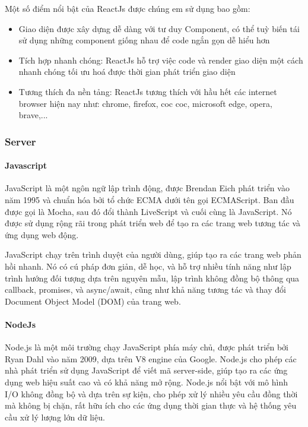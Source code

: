Một số điểm nổi bật của ReactJs được chúng em sử dụng bao gồm:


\begin{itemize}
  \item Giao diện được xây dựng dễ dàng với tư duy Component, có thể tuỳ biến tái sử dụng những component giống nhau để code ngắn gọn dễ hiểu hơn
  \item Tích hợp nhanh chóng: ReactJs hỗ trợ việc code và render giao diện một cách nhanh chóng tối ưu hoá được thời gian phát triển giao diện
  \item Tương thích đa nền tảng: ReactJs tương thích với hầu hết các internet browser hiện nay như: chrome, firefox, coc coc, microsoft edge, opera, brave,...
\end{itemize}

\subsubsection{Server}
\paragraph{Javascript}
\mbox{}

JavaScript là một ngôn ngữ lập trình động, được Brendan Eich phát triển vào năm 1995 và chuẩn hóa bởi tổ chức ECMA dưới tên gọi ECMAScript. Ban đầu được gọi là Mocha, sau đó đổi thành LiveScript và cuối cùng là JavaScript. Nó được sử dụng rộng rãi trong phát triển web để tạo ra các trang web tương tác và ứng dụng web động.

JavaScript chạy trên trình duyệt của người dùng, giúp tạo ra các trang web phản hồi nhanh. Nó có cú pháp đơn giản, dễ học, và hỗ trợ nhiều tính năng như lập trình hướng đối tượng dựa trên nguyên mẫu, lập trình không đồng bộ thông qua callback, promises, và async/await, cũng như khả năng tương tác và thay đổi Document Object Model (DOM) của trang web.


\paragraph{NodeJs}
\mbox{}
Node.js là một môi trường chạy JavaScript phía máy chủ, được phát triển bởi Ryan Dahl vào năm 2009, dựa trên V8 engine của Google. Node.js cho phép các nhà phát triển sử dụng JavaScript để viết mã server-side, giúp tạo ra các ứng dụng web hiệu suất cao và có khả năng mở rộng. Node.js nổi bật với mô hình I/O không đồng bộ và dựa trên sự kiện, cho phép xử lý nhiều yêu cầu đồng thời mà không bị chặn, rất hữu ích cho các ứng dụng thời gian thực và hệ thống yêu cầu xử lý lượng lớn dữ liệu.

